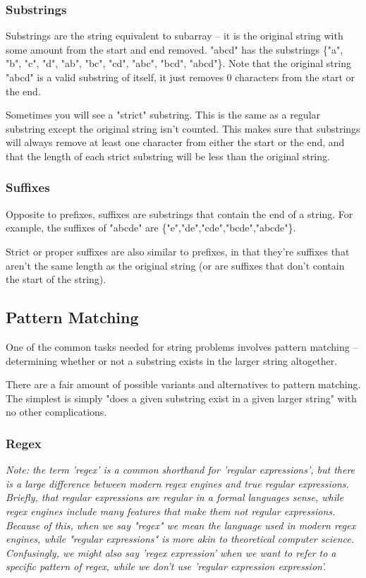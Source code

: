 \subsubsection{Substrings}

Substrings are the string equivalent to subarray -- it is the original string with some amount from the start and end removed. "abcd" has the substrings \{"a", "b", "c", "d", "ab", "bc", "cd", "abc", "bcd", "abcd"\}. Note that the original string "abcd" is a valid substring of itself, it just removes 0 characters from the start or the end.

Sometimes you will see a "strict" substring. This is the same as a regular substring except the original string isn't counted. This makes sure that substrings will always remove at least one character from either the start or the end, and that the length of each strict substring will be less than the original string.

\subsubsection{Suffixes}

Opposite to prefixes, suffixes are substrings that contain the end of a string. For example, the suffixes of "abcde" are \{"e","de","cde","bcde","abcde"\}.

Strict or proper suffixes are also similar to prefixes, in that they're suffixes that aren't the same length as the original string (or are suffixes that don't contain the start of the string).

\subsection{Pattern Matching}

One of the common tasks needed for string problems involves pattern matching -- determining whether or not a substring exists in the larger string altogether.

There are a fair amount of possible variants and alternatives to pattern matching. The simplest is simply "does a given substring exist in a given larger string" with no other complications.

\subsubsection{Regex}

\textit{Note: the term 'regex' is a common shorthand for 'regular expressions', but there is a large difference between modern regex engines and true regular expressions. Briefly, that regular expressions are regular in a formal languages sense, while regex engines include many features that make them not regular expressions. Because of this, when we say "regex" we mean the language used in modern regex engines, while "regular expressions" is more akin to theoretical computer science. Confusingly, we might also say 'regex expression' when we want to refer to a specific pattern of regex, while we don't use 'regular expression expression'.}

